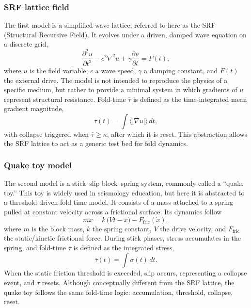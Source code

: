 \documentclass[12pt]{article}
\begin{document}
\subsubsection{SRF lattice field}
The first model is a simplified wave lattice, referred to here as the SRF (Structural Recursive Field). It evolves under a driven, damped wave equation on a discrete grid,
\begin{equation}
\frac{\partial^{2} u}{\partial t^{2}}
 - c^{2}\nabla^{2}u
 + \gamma \frac{\partial u}{\partial t}
 = F(t) ,
\label{eq:wave}
\end{equation}
where $u$ is the field variable, $c$ a wave speed, $\gamma$ a damping constant, and $F(t)$ the external drive.
The model is not intended to reproduce the physics of a specific medium, but rather to provide a minimal system in which gradients of $u$ represent structural resistance.
Fold-time $\bar{\tau}$ is defined as the time-integrated mean gradient magnitude,
\begin{equation}
\bar{\tau}(t) = \int \! \langle |\nabla u| \rangle \, dt ,
\label{eq:tau-srf}
\end{equation}
with collapse triggered when $\bar{\tau}\geq\kappa$, after which it is reset.
This abstraction allows the SRF lattice to act as a generic test bed for fold dynamics.
\subsubsection{Quake toy model}
The second model is a stick--slip block--spring system, commonly called a ``quake toy.'' This toy is widely used in seismology education, but here it is abstracted to a threshold-driven fold-time model.
It consists of a mass attached to a spring pulled at constant velocity across a frictional surface.
Its dynamics follow
\begin{equation}
m \ddot{x} = k \,\big(Vt - x\big) - F_{\mathrm{fric}}(\dot{x}) ,
\label{eq:quake}
\end{equation}
where $m$ is the block mass, $k$ the spring constant, $V$ the drive velocity, and $F_{\mathrm{fric}}$ the static/kinetic frictional force.
During stick phases, stress accumulates in the spring, and fold-time $\bar{\tau}$ is defined as the integrated stress,
\begin{equation}
\bar{\tau}(t) = \int \! \sigma(t)\, dt .
\label{eq:tau-quake}
\end{equation}
When the static friction threshold is exceeded, slip occurs, representing a collapse event, and $\bar{\tau}$ resets.
Although conceptually different from the SRF lattice, the quake toy follows the same fold-time logic: accumulation, threshold, collapse, reset.
\end{document}
